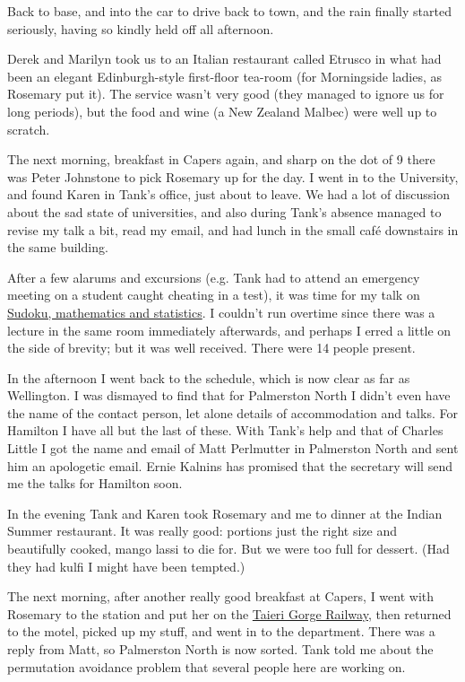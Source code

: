 \documentclass[12pt,a4paper]{article}
\begin{document}
Back to base, and into the car to drive back to town, and the rain finally
started seriously, having so kindly held off all afternoon.

Derek and Marilyn took us to an Italian restaurant called Etrusco in what
had been an elegant Edinburgh-style first-floor tea-room (for Morningside
ladies, as Rosemary put it). The service wasn't very good (they managed to
ignore us for long periods), but the food and wine (a New Zealand Malbec)
were well up to scratch.

The next morning, breakfast in Capers again, and sharp on the dot of 9 there
was Peter Johnstone to pick Rosemary up for the day. I went in to the
University, and found Karen in Tank's office, just about to leave. We had
a lot of discussion about the sad state of universities, and also during
Tank's absence managed to revise my talk a bit, read my email, and had lunch
in the small caf\'e downstairs in the same building.

After a few alarums and excursions (e.g. Tank had to attend an emergency
meeting on a student caught cheating in a test), it was time for my talk
on \href{sudoku.pdf}{Sudoku, mathematics and statistics}. I couldn't 
run overtime since there was a lecture in the same room immediately 
afterwards, and perhaps I erred a little on the side of brevity; but it 
was well received. There were 14 people present.

In the afternoon I went back to the schedule, which is now clear as far
as Wellington. I was dismayed to find that for Palmerston North I didn't
even have the name of the contact person, let alone details of 
accommodation and talks. For Hamilton I have all but the last of these.
With Tank's help and that of Charles Little I got the name and email of
Matt Perlmutter in Palmerston North and sent him an apologetic email.
Ernie Kalnins has promised that the secretary will send me the talks
for Hamilton soon.

In the evening Tank and Karen took Rosemary and me to dinner at the
Indian Summer restaurant. It was really good: portions just the right
size and beautifully cooked, mango lassi to die for. But we were too
full for dessert. (Had they had kulfi I might have been tempted.)

The next morning, after another really good breakfast at Capers, I went
with Rosemary to the station and put her on the 
\href{http://www.taieri.co.nz}{Taieri Gorge Railway}, then returned
to the motel, picked up my stuff, and went in to the department. There was
a reply from Matt, so Palmerston North is now sorted. Tank told me about
the permutation avoidance problem that several people here are working on.
\end{document}
